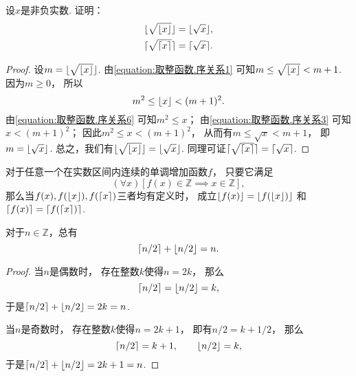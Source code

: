 \begin{example}
设\(x\)是非负实数.
证明：\begin{gather*}
	\lfloor\sqrt{\lfloor x\rfloor}\rfloor = \lfloor\sqrt{x}\rfloor, \\
	\lceil\sqrt{\lceil x\rceil}\rceil = \lceil\sqrt{x}\rceil.
\end{gather*}
\begin{proof}
设\(m = \lfloor\sqrt{\lfloor x\rfloor}\rfloor\).
由\cref{equation:取整函数.序关系1}
可知\(m \leq \sqrt{\lfloor x\rfloor} < m+1\).
因为\(m \geq 0\)，
所以\begin{equation*}
	m^2 \leq \lfloor x\rfloor < (m+1)^2.
\end{equation*}
由\cref{equation:取整函数.序关系6}
可知\(m^2 \leq x\)；
由\cref{equation:取整函数.序关系3}
可知\(x < (m+1)^2\)；
因此\(m^2 \leq x < (m+1)^2\)，
从而有\(m \leq \sqrt{x} < m+1\)，
即\(m = \lfloor\sqrt{x}\rfloor\).
总之，我们有\(\lfloor\sqrt{\lfloor x\rfloor}\rfloor = \lfloor\sqrt{x}\rfloor\).
同理可证\(\lceil\sqrt{\lceil x\rceil}\rceil = \lceil\sqrt{x}\rceil\).
\end{proof}
\end{example}
\begin{example}
对于任意一个在实数区间内连续的单调增加函数\(f\)，
只要它满足\begin{equation*}
	(\forall x)[f(x) \in \mathbb{Z} \implies x \in \mathbb{Z}],
\end{equation*}
那么当\(f(x),f(\lfloor x\rfloor),f(\lceil x\rceil)\)三者均有定义时，
成立\(\lfloor f(x)\rfloor = \lfloor f(\lfloor x\rfloor)\rfloor\)
和\(\lceil f(x)\rceil = \lceil f(\lceil x\rceil)\rceil\).
\end{example}

\begin{property}
对于\(n\in\mathbb{Z}\)，总有\begin{equation}
	\lceil n/2\rceil + \lfloor n/2\rfloor = n.
\end{equation}
\begin{proof}
当\(n\)是偶数时，
存在整数\(k\)使得\(n=2k\)，
那么\begin{equation*}
	\lceil n/2\rceil = \lfloor n/2\rfloor = k,
\end{equation*}
于是\(\lceil n/2\rceil + \lfloor n/2\rfloor = 2k = n\).

当\(n\)是奇数时，
存在整数\(k\)使得\(n=2k+1\)，
即有\(n/2 = k + 1/2\)，
那么\begin{equation*}
	\lceil n/2\rceil = k+1,
	\qquad
	\lfloor n/2\rfloor = k,
\end{equation*}
于是\(\lceil n/2\rceil + \lfloor n/2\rfloor = 2k+1 = n\).
\end{proof}
\end{property}


